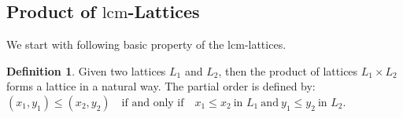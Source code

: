 \documentclass[11pt]{amsart}
\newcommand{\lcm}{\mathrm{lcm}}
\theoremstyle{plain}
\numberwithin{lemma}{\DefaultNumberTheoremWithin}
\numberwithin{claim}{\DefaultNumberTheoremWithin}
\newtheorem{theorem}{Theorem}
\numberwithin{theorem}{\DefaultNumberTheoremWithin}
\numberwithin{corollary}{\DefaultNumberTheoremWithin}
\numberwithin{proposition}{\DefaultNumberTheoremWithin}
\numberwithin{conjecture}{\DefaultNumberTheoremWithin}
\theoremstyle{definition}
\newtheorem{definition}{Definition}
\numberwithin{definition}{\DefaultNumberTheoremWithin}
\theoremstyle{definition}
\numberwithin{question}{\DefaultNumberTheoremWithin}
\theoremstyle{definition}
\numberwithin{problem}{\DefaultNumberTheoremWithin}
\theoremstyle{remark}
\numberwithin{remark}
     {\DefaultNumberTheoremWithin}
\theoremstyle{remark}
\numberwithin{example}{\DefaultNumberTheoremWithin}
\begin{document}
%
%
%
%
%
%
%
%
%
%
%
\subsection{Product of $\lcm$-Lattices}
We start with following basic property of the $\lcm$-lattices.
\begin{definition}
    Given two lattices $L_1$ and $L_2$, then the product of lattices $L_1 \times L_2$ forms a lattice in a natural way. The partial order is defined by:
\(
(x_1, y_1) \leq (x_2, y_2) 
\quad \text{if and only if} \quad
x_1 \leq x_2 \ \text{in } L_1 \ \text{and}\ y_1 \leq y_2 \ \text{in } L_2.
\)
\end{definition}
\end{document}
